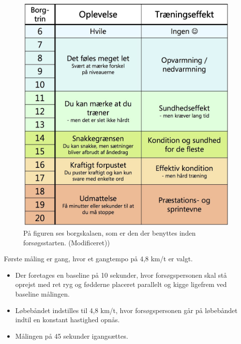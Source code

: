 \begin{figure}[H]
	\centering
	\includegraphics[scale=0.5]{figures/qBilag/Borg-skala.jpg}
	\caption{På figuren ses borgskalaen, som er den der benyttes inden forsøgsstarten. (Modificeret)\cite{Patientinformationen2013})}
	\label{fig:borgskala}
\end{figure}

Første måling er gang, hvor et gangtempo på 4,8 km/t er valgt\citep{Miles2007}. \vspace{-3mm}
\begin{itemize}
	\item Der foretages en baseline på 10 sekunder, hvor forsøgspersonen skal stå oprejst med ret ryg og fødderne placeret parallelt og kigge ligefrem ved baseline målingen.
	\item Løbebåndet indstilles til 4,8 km/t, hvor forsøgspersonen går på løbebåndet indtil en konstant hastighed opnås. 
	\item Målingen på 45 sekunder igangsættes.
\end{itemize}

